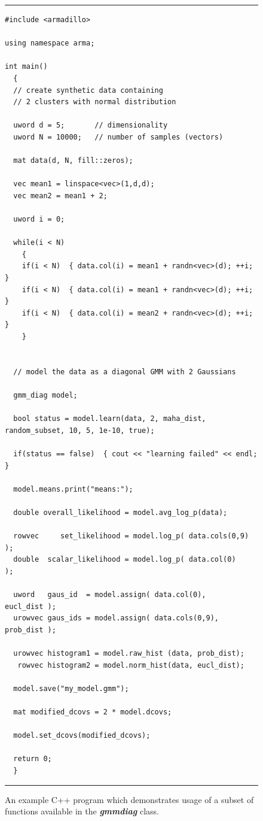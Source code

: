 \documentclass[10pt,a4paper]{article}
\def\_{{\tt\char95}}
\begin{document}
\begin{figure}[!h]
\vspace{1ex}
\hrule
\vspace{1ex}
\centering
\begin{adjustbox}{minipage=\columnwidth,scale={1.2}{1.2}}
\begin{Verbatim}[fontsize=\footnotesize]
#include <armadillo>

using namespace arma;

int main()
  {
  // create synthetic data containing
  // 2 clusters with normal distribution
  
  uword d = 5;       // dimensionality
  uword N = 10000;   // number of samples (vectors)
  
  mat data(d, N, fill::zeros);
  
  vec mean1 = linspace<vec>(1,d,d);
  vec mean2 = mean1 + 2;
  
  uword i = 0;
  
  while(i < N)
    {
    if(i < N)  { data.col(i) = mean1 + randn<vec>(d); ++i; }
    if(i < N)  { data.col(i) = mean1 + randn<vec>(d); ++i; }
    if(i < N)  { data.col(i) = mean2 + randn<vec>(d); ++i; }
    }
  
  
  // model the data as a diagonal GMM with 2 Gaussians
  
  gmm_diag model;
  
  bool status = model.learn(data, 2, maha_dist, random_subset, 10, 5, 1e-10, true);
  
  if(status == false)  { cout << "learning failed" << endl; }
  
  model.means.print("means:");
  
  double overall_likelihood = model.avg_log_p(data);
  
  rowvec     set_likelihood = model.log_p( data.cols(0,9) );
  double  scalar_likelihood = model.log_p( data.col(0)    );
  
  uword   gaus_id  = model.assign( data.col(0),    eucl_dist );
  urowvec gaus_ids = model.assign( data.cols(0,9), prob_dist );
  
  urowvec histogram1 = model.raw_hist (data, prob_dist);
   rowvec histogram2 = model.norm_hist(data, eucl_dist);
  
  model.save("my_model.gmm");
  
  mat modified_dcovs = 2 * model.dcovs;
  
  model.set_dcovs(modified_dcovs);
  
  return 0;
  }

\end{Verbatim}
\end{adjustbox}
\hrule
\vspace{0.5ex}
\caption
  {
  An example C++ program which demonstrates usage of a subset of functions available in the {\it\bfseries gmm\_diag} class.
  }
\label{fig:example_usage}
\end{figure}
\end{document}
